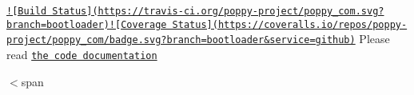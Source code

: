 \href{https://travis-ci.org/poppy-project/poppy_com}{\tt !\mbox{[}Build Status\mbox{]}(https\-://travis-\/ci.\-org/poppy-\/project/poppy\-\_\-com.\-svg?branch=bootloader)}\href{https://coveralls.io/github/poppy-project/poppy_com?branch=bootloader}{\tt !\mbox{[}Coverage Status\mbox{]}(https\-://coveralls.\-io/repos/poppy-\/project/poppy\-\_\-com/badge.\-svg?branch=bootloader\&service=github)} Please read \href{http://poppy-project.github.io/poppy_com/}{\tt the code documentation}

$<$span 